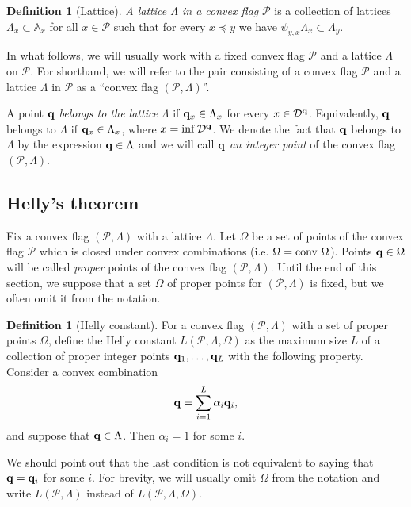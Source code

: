 \documentclass{daj}
\newcommand{\A}{\mathbb A}
\newcommand{\conv}{{\rm conv}\,}
\newcommand{\D}{\mathcal D}
\renewcommand{\P}{\mathcal P}
\theoremstyle{definition}
\newtheorem{defi}[theorem]{Definition}
\theoremstyle{remark}
\theoremstyle{definition}
\theoremstyle{definition}
\begin{document}
\begin{defi}[Lattice]
\emph{A lattice $\Lambda$ in a convex flag} $\P$ is a collection of lattices $\Lambda_x \subset \A_x$ for all $x \in \P$ such that for every $x \preceq y$ we have $\psi_{y, x}\Lambda_x \subset \Lambda_y$.
\end{defi}

In what follows, we will usually work with a fixed convex flag $\P$ and a lattice $\Lambda$ on $\P$. For shorthand, we will refer to the pair consisting of a convex flag $\P$ and a lattice $\Lambda$ in $\P$ as a ``convex flag $(\P, \Lambda)$''.

A point $\bf q$ {\it belongs to the lattice} $\Lambda$ if ${\bf q}_x \in \Lambda_x$ for every $x \in \D^{\bf q}$. Equivalently, $\bf q$ belongs to $\Lambda$ if ${\bf q}_x \in \Lambda_x$, where $x = \inf \D^{{\bf q}}$. We denote the fact that ${\bf q}$ belongs to $\Lambda$ by the expression ${\bf q} \in \Lambda$ and we will call ${\bf q}$ {\it an integer point} of the convex flag $(\P, \Lambda)$. 

\subsection{Helly's theorem}

Fix a convex flag $(\P, \Lambda)$ with a lattice $\Lambda$. Let $\Omega$ be a set of points of the convex flag $\P$ which is closed under convex combinations (i.e. $\Omega = \conv\,\Omega$). Points ${\bf q} \in \Omega$ will be called {\it proper} points of the convex flag $(\P, \Lambda)$. Until the end of this section, we suppose that a set $\Omega$ of proper points for $(\P, \Lambda)$ is fixed, but we often omit it from the notation.

\begin{defi}[Helly constant]\label{arithm}
For a convex flag $(\P, \Lambda)$ with a set of proper points $\Omega$, define the Helly constant $L(\P, \Lambda, \Omega)$ as the maximum size $L$ of a collection of proper integer points ${\bf q}_1, \ldots, {\bf q}_L$ with the following property. Consider a convex combination
$$
{\bf q} = \sum_{i=1}^L \alpha_i {\bf q}_i,
$$
and suppose that ${\bf q} \in \Lambda$. Then $\alpha_i = 1$ for some $i$.
\end{defi}

We should point out that the last condition is not equivalent to saying that ${\bf q} = {\bf q}_i$ for some $i$. For brevity, we will usually omit $\Omega$ from the notation and write $L(\P, \Lambda)$ instead of $L(\P, \Lambda, \Omega)$.
\end{document}
